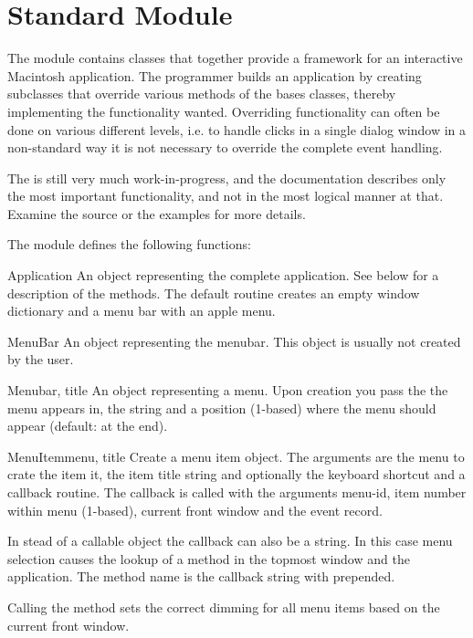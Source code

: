 \section{Standard Module }
\label{module-FrameWork}

The  module contains classes that together provide a
framework for an interactive Macintosh application. The programmer
builds an application by creating subclasses that override various
methods of the bases classes, thereby implementing the functionality
wanted. Overriding functionality can often be done on various
different levels, i.e. to handle clicks in a single dialog window in a
non-standard way it is not necessary to override the complete event
handling.

The  is still very much work-in-progress, and the
documentation describes only the most important functionality, and not
in the most logical manner at that. Examine the source or the examples
for more details.

The  module defines the following functions:


\begin{funcdesc}{Application}{}
An object representing the complete application. See below for a
description of the methods. The default  routine
creates an empty window dictionary and a menu bar with an apple menu.
\end{funcdesc}

\begin{funcdesc}{MenuBar}{}
An object representing the menubar. This object is usually not created
by the user.
\end{funcdesc}

\begin{funcdesc}{Menu}{bar, title}
An object representing a menu. Upon creation you pass the
 the menu appears in, the  string and a
position (1-based)  where the menu should appear (default:
at the end).
\end{funcdesc}

\begin{funcdesc}{MenuItem}{menu, title}
Create a menu item object. The arguments are the menu to crate the
item it, the item title string and optionally the keyboard shortcut
and a callback routine. The callback is called with the arguments
menu-id, item number within menu (1-based), current front window and
the event record.

In stead of a callable object the callback can also be a string. In
this case menu selection causes the lookup of a method in the topmost
window and the application. The method name is the callback string
with  prepended.

Calling the   method sets the
correct dimming for all menu items based on the current front window.
\end{funcdesc}

